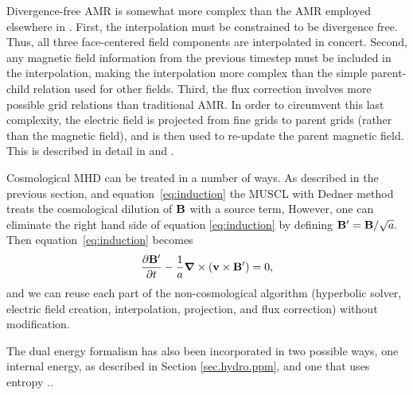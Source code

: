 Divergence-free AMR is somewhat more complex than the AMR employed
elsewhere in \enzo.  First, the interpolation must be constrained to be
divergence free.  Thus, all three face-centered field components are
interpolated in concert.  Second, any magnetic field information from
the previous timestep must be included in the interpolation, making the
interpolation more complex than the simple parent-child relation used
for other fields.  Third, the flux correction involves more possible
grid relations than traditional AMR.  In order to circumvent this last
complexity, the electric field is projected from fine grids to parent
grids (rather than the magnetic field), and is then used to re-update
the parent magnetic field.  This is described in detail in
\citet{Balsara99} and \citet{Collins10}.

Cosmological MHD can be treated in a number of ways.  As described in 
the previous section, and equation~\ref{eq:induction} the MUSCL with Dedner
method treats the cosmological dilution of
$\mathbf{B}$ with a source term,  However, one can eliminate the right hand side of equation 
\ref{eq:induction} by defining
$\mathbf{B}^\prime = \mathbf{B} / \sqrt{a}.$
Then equation~\ref{eq:induction} becomes
$$ 
\frac{\partial \mathbf{B}^\prime}{\partial t} - \frac{1}{a}  \bm{\nabla} \times (\mathbf{v} \times
\mathbf{B}^\prime)  = 0, \label{eq:induction_cosmo_prime_nosource}
$$
and we can reuse each part of the non-cosmological algorithm (hyperbolic solver,
electric field creation, interpolation, projection, and flux correction) without
modification.  

The dual energy formalism has also been incorporated in two possible ways, one internal
energy, as described in Section \ref{sec.hydro.ppm}, and one that
uses entropy \cite{TVD93, Collins10}..  

%

